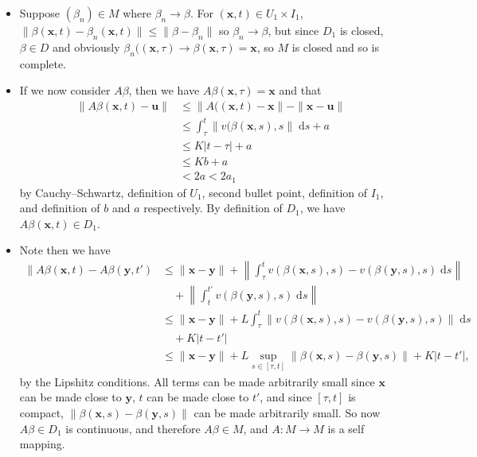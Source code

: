 \documentclass[letter-paper]{tufte-book}
\newenvironment{proof}[1][Proof]{\begin{trivlist}
\item[\hskip \labelsep {\bfseries #1}]}{\end{trivlist}}
\begin{document}
\begin{proof}
\begin{itemize}
    \item Suppose $(\beta_n) \in M$ where $\beta_n \to \beta$. For
    $(\boldsymbol{x}, t) \in U_1 \times I_1$, $\|\beta(\boldsymbol{x}, t) -
    \beta_n (\boldsymbol{x}, t)\| \leq \|\beta - \beta_n\|$ so $\beta_n \to
    \beta$, but since $D_1$ is closed, $\beta \in D$ and obviously
    $\beta_n((\boldsymbol{x}, \tau) \to \beta(\boldsymbol{x}, \tau) =
    \boldsymbol{x}$, so $M$ is closed and so is complete.
    
    \item If we now consider $A\beta$, then we have $A\beta(\boldsymbol{x},
    \tau) = \boldsymbol{x}$ and that
    \begin{align*}
      \|A\beta(\boldsymbol{x}, t) - \boldsymbol{u}\| & \leq \|A((\boldsymbol{x}, t) - \boldsymbol{x}\|  - \| \boldsymbol{x} - \boldsymbol{u}\|\\
        &\leq \int_\tau^t \|v(\beta(\boldsymbol{x}, s), s\|\; \mathrm{d}s + a\\
        &\leq K|t - \tau| + a\\
        &\leq Kb + a\\
        &< 2a < 2a_1 
    \end{align*}
    by Cauchy--Schwartz, definition of $U_1$, second bullet point, definition of
    $I_1$, and definition of $b$ and $a$ respectively. By definition of $D_1$,
    we have $A\beta(\boldsymbol{x}, t) \in D_1$.
    
    \item Note then we have
    \begin{align*}
      \|A\beta(\boldsymbol{x}, t) - A\beta(\boldsymbol{y}, t') &\leq \|\boldsymbol{x} - \boldsymbol{y}\| + \left\|\int_\tau^t v(\beta(\boldsymbol{x}, s), s) - v(\beta(\boldsymbol{y}, s), s)\; \mathrm{d}s\right\|\\
        &\quad + \left\|\int_t^{t'} v(\beta(\boldsymbol{y}, s), s)\; \mathrm{d}s\right\|\\
      &\leq \|\boldsymbol{x} - \boldsymbol{y}\| + L\int_\tau^t \left\|v(\beta(\boldsymbol{x}, s), s) - v(\beta(\boldsymbol{y}, s), s)\right\|\; \mathrm{d}s\\
        &\quad + K|t - t'|\\
      &\leq \|\boldsymbol{x} - \boldsymbol{y}\| + L \sup_{s\in[\tau, t]}\|\beta(\boldsymbol{x}, s) - \beta(\boldsymbol{y}, s)\| + K|t - t'|,
    \end{align*}
    by the Lipshitz conditions. All terms can be made arbitrarily small since
    $\boldsymbol{x}$ can be made close to $\boldsymbol{y}$, $t$ can be made
    close to $t'$, and since $[\tau, t]$ is compact, $\|\beta(\boldsymbol{x}, s)
    - \beta(\boldsymbol{y}, s)\|$ can be made arbitrarily small. So now $A\beta
    \in D_1$ is continuous, and therefore $A\beta \in M$, and $A : M \to M$ is a
    self mapping.
    

\end{itemize}
\end{proof}
\end{document}
